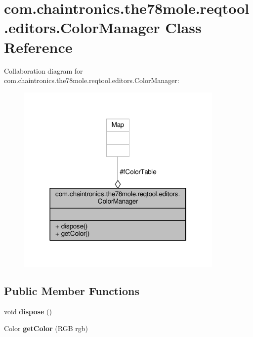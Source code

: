 \hypertarget{classcom_1_1chaintronics_1_1the78mole_1_1reqtool_1_1editors_1_1ColorManager}{}\section{com.\+chaintronics.\+the78mole.\+reqtool.\+editors.\+Color\+Manager Class Reference}
\label{classcom_1_1chaintronics_1_1the78mole_1_1reqtool_1_1editors_1_1ColorManager}


Collaboration diagram for com.\+chaintronics.\+the78mole.\+reqtool.\+editors.\+Color\+Manager\+:\nopagebreak
\begin{figure}[H]
\begin{center}
\leavevmode
\includegraphics[width=286pt]{d3/d4f/classcom_1_1chaintronics_1_1the78mole_1_1reqtool_1_1editors_1_1ColorManager__coll__graph}
\end{center}
\end{figure}
\subsection*{Public Member Functions}
\begin{DoxyCompactItemize}
\item 
void {\bfseries dispose} ()\hypertarget{classcom_1_1chaintronics_1_1the78mole_1_1reqtool_1_1editors_1_1ColorManager_ae18275fcad50628bc88fb640c8290bbd}{}\label{classcom_1_1chaintronics_1_1the78mole_1_1reqtool_1_1editors_1_1ColorManager_ae18275fcad50628bc88fb640c8290bbd}

\item 
Color {\bfseries get\+Color} (R\+GB rgb)\hypertarget{classcom_1_1chaintronics_1_1the78mole_1_1reqtool_1_1editors_1_1ColorManager_aff14b437899532ee6cd35caa024fffa5}{}\label{classcom_1_1chaintronics_1_1the78mole_1_1reqtool_1_1editors_1_1ColorManager_aff14b437899532ee6cd35caa024fffa5}

\end{DoxyCompactItemize}
